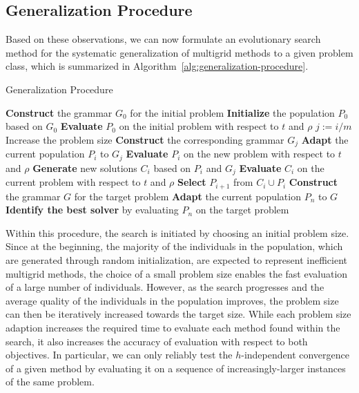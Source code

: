 \subsection{Generalization Procedure}
Based on these observations, we can now formulate an evolutionary search method for the systematic generalization of multigrid methods to a given problem class, which is summarized in Algorithm~\ref{alg:generalization-procedure}.
\begin{algorithm}
	\caption{Generalization Procedure}
	\label{alg:generalization-procedure}
	\begin{algorithmic}[1] %
		\State \textbf{Construct} the grammar $G_0$ for the initial problem
		\State \textbf{Initialize} the population $P_0$ based on $G_0$
		\State \textbf{Evaluate} $P_0$ on the initial problem with respect to $t$ and $\rho$
		\State $j := i / m$ 
		\State Increase the problem size
		\State \textbf{Construct} the corresponding grammar $G_j$
		\State  \textbf{Adapt} the current population $P_i$ to $G_j$
		\State \textbf{Evaluate} $P_i$ on the new problem with respect to $t$ and $\rho$
		\EndIf
		\State \textbf{Generate} new solutions $C_i$ based on $P_i$ and $G_j$
		\State \textbf{Evaluate} $C_i$ on the current problem with respect to $t$ and $\rho$
		\State \textbf{Select} $P_{i+1}$ from $C_i \cup P_i$
		\EndFor
		\State \textbf{Construct} the grammar $G$ for the target problem
		\State  \textbf{Adapt} the current population $P_n$ to $G$
		\State \textbf{Identify the best solver} by evaluating $P_{n}$ on the target problem
	\end{algorithmic}
\end{algorithm}
Within this procedure, the search is initiated by choosing an initial problem size.
Since at the beginning, the majority of the individuals in the population, which are generated through random initialization, are expected to represent inefficient multigrid methods, the choice of a small problem size enables the fast evaluation of a large number of individuals.
However, as the search progresses and the average quality of the individuals in the population improves, the problem size can then be iteratively increased towards the target size.
While each problem size adaption increases the required time to evaluate each method found within the search, it also increases the accuracy of evaluation with respect to both objectives.
In particular, we can only reliably test the $h$-independent convergence of a given method by evaluating it on a sequence of increasingly-larger instances of the same problem.
